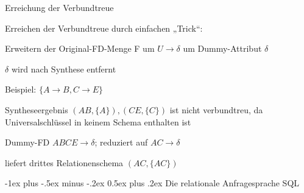 \documentclass[a4paper]{article}
\makeatletter
\renewcommand{\section}{\@startsection{section}{1}{0mm}%
                                {-1ex plus -.5ex minus -.2ex}%
                                {0.5ex plus .2ex}%
                                {\normalfont\large\bfseries}}
\makeatother
\begin{document}
\begin{multicols}{3}
Erreichung der Verbundtreue
\begin{itemize*}
    \item Erreichen der Verbundtreue durch einfachen „Trick“:
    \begin{itemize*}
        \item Erweitern der Original-FD-Menge F um $U\rightarrow \delta$ um Dummy-Attribut $\delta$
        \item $\delta$ wird nach Synthese entfernt
    \end{itemize*}
    \item Beispiel: $\{A\rightarrow B, C\rightarrow E\}$
    \begin{itemize*}
        \item Syntheseergebnis $(AB, \{A\}), (CE, \{C\})$ ist nicht verbundtreu, da Universalschlüssel in keinem Schema enthalten ist
        \item Dummy-FD $ABCE\rightarrow \delta$; reduziert auf $AC\rightarrow\delta$
        \item liefert drittes Relationenschema $(AC,\{AC\})$
    \end{itemize*}
\end{itemize*}


\section{Die relationale Anfragesprache SQL}

\end{multicols}
\end{document}
